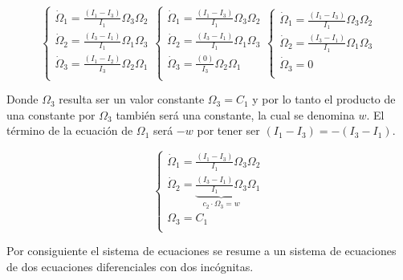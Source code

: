 \documentclass[oneside,a4paper,english,links]{amca}
\begin{document}
\begin{equation}
\begin{cases}
    \dot{\Omega}_1=\frac{\left(I_1-I_3\right)}{I_1}\Omega_3\Omega_2\\
    \dot{\Omega}_2=\frac{\left(I_3-I_1\right)}{I_1}\Omega_1\Omega_3\\
    \dot{\Omega}_3=\frac{\left(I_1-I_2\right)}{I_3}\Omega_2\Omega_1\\
    \end{cases}
    \begin{cases}
    \dot{\Omega}_1=\frac{\left(I_1-I_3\right)}{I_1}\Omega_3\Omega_2\\
    \dot{\Omega}_2=\frac{\left(I_3-I_1\right)}{I_1}\Omega_1\Omega_3\\
    \dot{\Omega}_3=\frac{\left(0\right)}{I_3}\Omega_2\Omega_1\\
    \end{cases}
        \begin{cases}
    \dot{\Omega}_1=\frac{\left(I_1-I_3\right)}{I_1}\Omega_3\Omega_2\\
    \dot{\Omega}_2=\frac{\left(I_3-I_1\right)}{I_1}\Omega_1\Omega_3\\
    \dot{\Omega}_3=0\\
    \end{cases}
    \label{eq:cinemat_ODEs_vel_angular_sin_torques_ecternos_symmetrical_top}
\end{equation}

Donde $\Omega_3$ resulta ser un valor constante $\Omega_3=C_1$ y por lo tanto el producto de una constante por $\Omega_3$ tambi\'en ser\'a una constante, la cual se denomina $w$. El t\'ermino de la ecuaci\'on de $\Omega_1$ ser\'a $-w$ por tener ser $(I_1-I_3)=-(I_3-I_1)$.

\begin{equation}
            \begin{cases}
    \dot{\Omega}_1=\frac{\left(I_1-I_3\right)}{I_1}\Omega_3\Omega_2\\
    \dot{\Omega}_2=\underbrace{\frac{\left(I_3-I_1\right)}{I_1}\Omega_3}_{c_2\cdot\Omega_3=w}\Omega_1\\
    \Omega_3=C_1\\
    \end{cases}
    \label{eq:cinemat_ODEs_vel_angular_sin_torques_ecternos_symmetrical_top_omega3_c1}
\end{equation}

Por consiguiente el sistema de ecuaciones se resume a un sistema de ecuaciones de dos ecuaciones diferenciales con dos inc\'ognitas.
\end{document}
